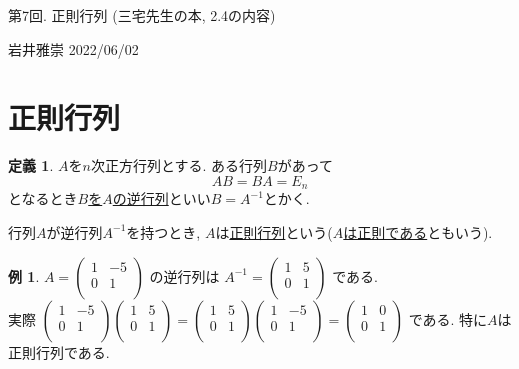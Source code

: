 \documentclass[dvipdfmx,a4paper,11pt]{article}
\theoremstyle{definition}
\newtheorem{dfn}[thm]{定義}
\newtheorem{exa}[thm]{例}
\begin{document}
\newpage

\begin{center}
{\Large 第7回. 正則行列 (三宅先生の本, 2.4の内容)}
\end{center}

\begin{flushright}
 岩井雅崇 2022/06/02
\end{flushright}
\section{正則行列}

\begin{tcolorbox}[
    colback = white,
    colframe = green!35!black,
    fonttitle = \bfseries,
    breakable = true]
    \begin{dfn}
$A$を$n$次正方行列とする.
 ある行列$B$があって
 $$
 AB =BA =E_{n} %
 $$
 となるとき\underline{$B$を$A$の逆行列}といい$B=A^{-1}$とかく.
 
 行列$A$が逆行列$A^{-1}$を持つとき, $A$は\underline{正則行列}という(\underline{$A$は正則である}ともいう).
  \end{dfn}
 \end{tcolorbox}
 
 \begin{exa}
 $A=
  \begin{pmatrix}
 1& -5  \\
 0& 1  \\
 \end{pmatrix} 
 $
 の逆行列は
  $A^{-1}=
  \begin{pmatrix}
 1& 5  \\
 0& 1  \\
 \end{pmatrix} 
 $
 である. \\ 
 実際
  $
  \begin{pmatrix}
 1& -5  \\
 0& 1  \\
 \end{pmatrix} 
  \begin{pmatrix}
 1& 5  \\
 0& 1  \\
 \end{pmatrix} 
=
  \begin{pmatrix}
 1& 5  \\
 0& 1  \\
 \end{pmatrix} 
   \begin{pmatrix}
 1& -5  \\
 0& 1  \\
 \end{pmatrix} 
 =
   \begin{pmatrix}
 1& 0 \\
 0& 1  \\
 \end{pmatrix} 
 $
 である.
 特に$A$は正則行列である. 
 \end{exa}
\end{document}
